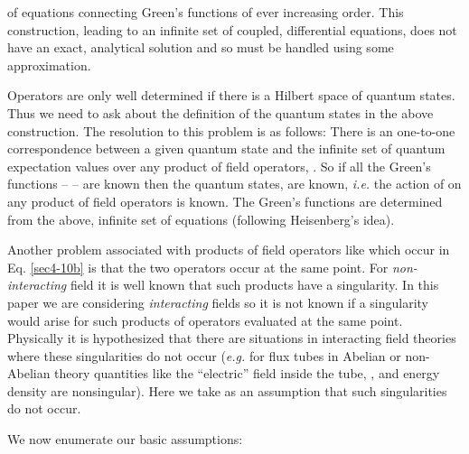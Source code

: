 \documentclass[a4paper,aps,showpacs]{revtex4}
\begin{document}
of equations connecting Green's functions of ever increasing
order. This construction, leading to an infinite set of coupled,
differential equations, does not have an exact, analytical solution
and so must be handled using some approximation.
\par
Operators are only well determined if there is a Hilbert space of quantum
states. Thus we need to ask about the definition of the quantum states
\coordHE{} in the above construction. The resolution to this
problem is as follows: There is an one-to-one correspondence
between a given quantum state \coordHE{} and the infinite set
of quantum expectation values over any product of field operators,
\coordHE{}. So if all the Green's functions
-- \coordHE{} --
are known then the quantum states, \coordHE{} are known,
\textit{i.e.} the action of \coordHE{} on any product
of field operators \coordHE{}
is known. The Green's functions are determined from the above,
infinite set of equations (following Heisenberg's idea).
\par
Another problem associated with products of field operators
like \coordHE{} which occur in
Eq. \eqref{sec4-10b} is that the two operators occur at the
same point. For \textit{non-interacting} field it is well
known that such products have a singularity. In this paper
we are considering \textit{interacting} fields so it is
not known if a singularity would arise for such products
of operators evaluated at the same point. Physically
it is hypothesized that there are situations in interacting
field theories where these singularities do not occur
({\it e.g.} for flux tubes in Abelian or non-Abelian theory
quantities like the ``electric'' field inside the tube,
\coordHE{}, and energy density
\coordHE{} are
nonsingular). Here we take as an assumption that such singularities
do not occur.
\par
We now enumerate our basic assumptions:
\end{document}

